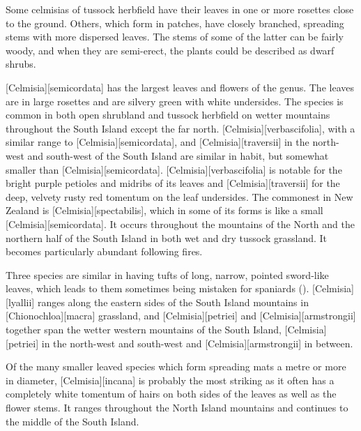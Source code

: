 Some celmisias of tussock herbfield have their leaves in one or more rosettes close to the ground.
Others, which form in patches, have closely branched, spreading stems with more dispersed leaves.
The stems of some of the latter can be fairly woody, and when they are semi-erect, the plants could be described as dwarf shrubs.

[Celmisia][semicordata] has the largest leaves and flowers of the genus.
The leaves are in large rosettes and are silvery green with white undersides.
The species is common in both open shrubland and tussock herbfield on wetter mountains throughout the South Island except the far north. [Celmisia][verbascifolia], with a similar range to [Celmisia][semicordata], and [Celmisia][traversii]  in the north-west and south-west of the South Island are similar in habit, but somewhat smaller than [Celmisia][semicordata]. [Celmisia][verbascifolia] is notable for the bright purple petioles and midribs of its leaves and [Celmisia][traversii] for the deep, velvety rusty red tomentum on the leaf undersides.
The commonest  in New Zealand is [Celmisia][spectabilis], which in some of its forms is like a small [Celmisia][semicordata].
It occurs throughout the mountains of the North and the northern half of the South Island in both wet and dry tussock grassland.
It becomes particularly abundant following fires.

Three species are similar in having tufts of long, narrow, pointed sword-like leaves, which leads to them sometimes being mistaken for spaniards (). [Celmisia][lyallii] ranges along the eastern sides of the South Island mountains in [Chionochloa][macra] grassland, and [Celmisia][petriei]  and [Celmisia][armstrongii]  together span the wetter western mountains of the South Island, [Celmisia][petriei]  in the north-west and south-west and [Celmisia][armstrongii]  in between.

Of the many smaller leaved species which form spreading mats a metre or more in diameter, [Celmisia][incana] is probably the most striking as it often has a completely white tomentum of hairs on both sides of the leaves as well as the flower stems.
It ranges throughout the North Island mountains and continues to the middle of the South Island.

